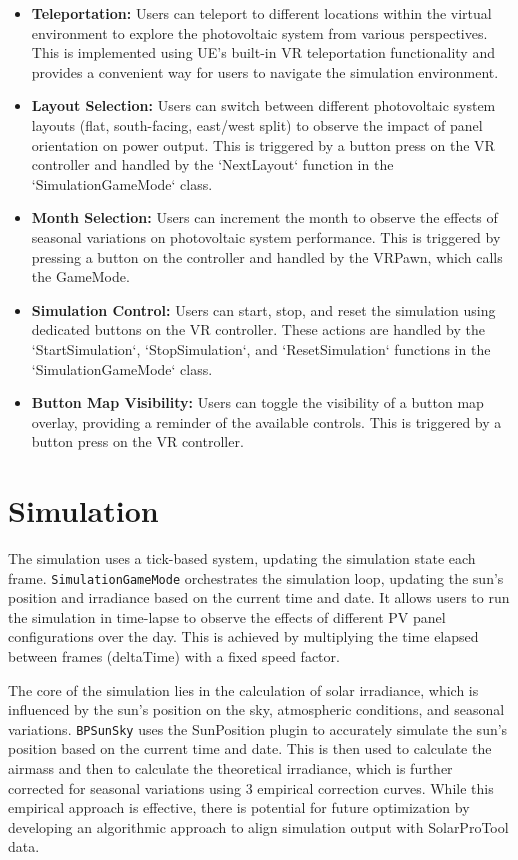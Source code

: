 \documentclass[draft, final]{vutinfth} %
\begin{document}
\begin{itemize}
    \item \textbf{Teleportation:} Users can teleport to different locations within the virtual environment to explore the photovoltaic system from various perspectives. This is implemented using UE's built-in VR teleportation functionality and provides a convenient way for users to navigate the simulation environment.
    \item \textbf{Layout Selection:} Users can switch between different photovoltaic system layouts (flat, south-facing, east/west split) to observe the impact of panel orientation on power output. This is triggered by a button press on the VR controller and handled by the `NextLayout` function in the `SimulationGameMode` class.
    \item \textbf{Month Selection:} Users can increment the month to observe the effects of seasonal variations on photovoltaic system performance. This is triggered by pressing a button on the controller and handled by the VRPawn, which calls the GameMode.
    \item \textbf{Simulation Control:} Users can start, stop, and reset the simulation using dedicated buttons on the VR controller. These actions are handled by the `StartSimulation`, `StopSimulation`, and `ResetSimulation` functions in the `SimulationGameMode` class.
    \item \textbf{Button Map Visibility:} Users can toggle the visibility of a button map overlay, providing a reminder of the available controls. This is triggered by a button press on the VR controller.
\end{itemize}

\section{Simulation}

The simulation uses a tick-based system, updating the simulation state each frame. \lstinline|SimulationGameMode| orchestrates the simulation loop, updating the sun's position and irradiance based on the current time and date. It allows users to run the simulation in time-lapse to observe the effects of different PV panel configurations over the day. This is achieved by multiplying the time elapsed between frames (deltaTime) with a fixed speed factor.

The core of the simulation lies in the calculation of solar irradiance, which is influenced by the sun's position on the sky, atmospheric conditions, and seasonal variations. \lstinline|BPSunSky| uses the SunPosition plugin to accurately simulate the sun's position based on the current time and date. This is then used to calculate the airmass and then to calculate the theoretical irradiance, which is further corrected for seasonal variations using 3 empirical correction curves. While this empirical approach is effective, there is potential for future optimization by developing an algorithmic approach to align simulation output with SolarProTool data.
\end{document}
